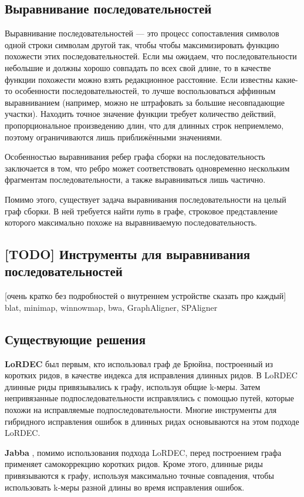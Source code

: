 \documentclass[14pt]{matmex-diploma-custom}
\begin{document}
\subsection{Выравнивание последовательностей}
Выравнивание последовательностей --- это процесс сопоставления символов одной строки символам другой так, чтобы чтобы максимизировать функцию похожести этих последовательностей. Если мы ожидаем, что последовательности небольшие и должны хорошо совпадать по всех свой длине, то в качестве функции похожести можно взять редакционное расстояние. Если известны какие-то особенности последовательностей, то лучше воспользоваться аффинным выравниванием (например, можно не штрафовать за большие несовпадающие участки). Находить точное значение функции требует количество действий, пропорциональное произведению длин, что для длинных строк неприемлемо, поэтому ограничиваются лишь приближёнными значениями.

Особенностью выравнивания ребер графа сборки на последовательность заключается в том, что ребро может соответствовать одновременно нескольким фрагментам последовательности, а также выравниваться лишь частично.

Помимо этого, существует задача выравнивания последовательности на целый граф сборки. В ней требуется найти \textit{путь} в графе, строковое представление которого максимально похоже на выравниваемую последовательность. 

\subsection{[TODO] Инструменты для выравнивания последовательностей }
[очень кратко без подробностей о внутреннем устройстве сказать про каждый] blat, minimap, winnowmap, bwa, GraphAligner, SPAligner

\subsection{Существующие решения}
\textbf{LoRDEC} \cite{art:salmela2014lordec} был первым, кто использовал граф де Брюйна, построенный из коротких ридов, в качестве индекса для исправления длинных ридов. В LoRDEC длинные риды привязывались к графу, используя общие k-меры. Затем непривязанные подпоследовательности исправлялись с помощью путей, которые похожи на исправляемые подпоследовательности. Многие инструменты для гибридного исправления ошибок в длинных ридах основываются на этом подходе LoRDEC.

\textbf{Jabba} \cite{art:miclotte2016jabba}, помимо использования подхода LoRDEC, перед построением графа применяет самокоррекцию коротких ридов. Кроме этого, длинные риды привязываются к графу, используя максимально точные совпадения, чтобы использовать k-меры разной длины во время исправления ошибок.
\end{document}
